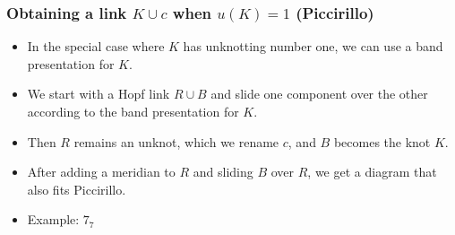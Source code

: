 \documentclass{beamer}
\theoremstyle{ex}
\theoremstyle{rem}
\begin{document}
	\begin{frame}
		\frametitle{Obtaining a link $K\cup c$ when $u(K)=1$ (Piccirillo)}
		\begin{itemize}
			\item In the special case where $K$ has unknotting number one, we can use a band presentation for $K$.
			
			\item We start with a Hopf link $R\cup B$ and slide one component over the other according to the band presentation for $K$.
			
			\item Then $R$ remains an unknot, which we rename $c$, and $B$ becomes the knot $K$.
			
			\item After adding a meridian to $R$ and sliding $B$ over $R$, we get a diagram that also fits Piccirillo.
			
			\item Example: $7_7$
			

\end{itemize}
\end{frame}
\end{document}
